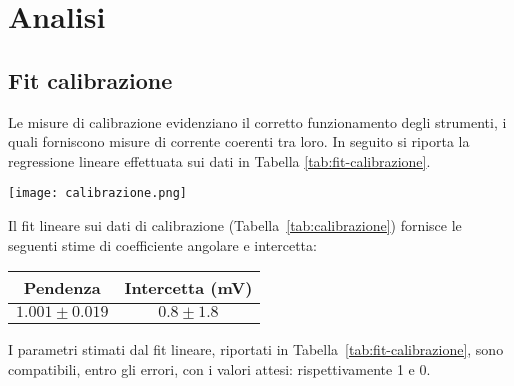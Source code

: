 \documentclass[@SRC@/main]{subfiles}
\begin{document}
    \vspace{1.5}


    \section{Analisi}

    \subsection{Fit calibrazione}
    Le misure di calibrazione evidenziano il corretto funzionamento degli
    strumenti, i quali forniscono misure di corrente coerenti tra loro. In seguito
    si riporta la regressione lineare effettuata sui dati in Tabella \ref{tab:fit-calibrazione}.
    \vspace{1.5}
    \begin{center}
        \begin{minipage}{.8\textwidth}
            \centering
            \texttt{[image: calibrazione.png]}
            \label{fig:calibrazione}
        \end{minipage}
    \end{center}

    \newpage
    \vspace{1.5}
    \newline
    \noindent Il fit lineare sui dati di calibrazione (Tabella~\ref{tab:calibrazione}) fornisce le seguenti stime di coefficiente angolare e intercetta:
    \vspace{1.5}
    \begin{center}
        \begin{minipage}{.95\textwidth}
            \centering
            \begin{tabular}{||c|c||}
                \hline
                Pendenza          & Intercetta (mV) \\
                \hline
                $1.001 \pm 0.019$ & $0.8 \pm 1.8$   \\
                \hline
            \end{tabular}
            \label{tab:fit-calibrazione}
        \end{minipage}
    \end{center}
    \vspace{2}
    I parametri stimati dal fit lineare, riportati in Tabella~\ref{tab:fit-calibrazione},
    sono compatibili, entro gli errori, con i valori attesi: rispettivamente 1 e 0.
\end{document}
